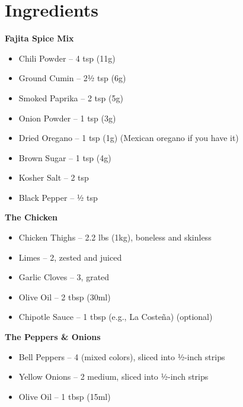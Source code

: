 




\section*{Ingredients}

\textbf{Fajita Spice Mix}
\begin{itemize}[itemsep=0.1em, label={\raisebox{-0.1ex}{\large\textbullet}}]
      \item[\measure] Chili Powder – 4 tsp (11g)
      \item[\measure] Ground Cumin – 2½ tsp (6g)
      \item[\measure] Smoked Paprika – 2 tsp (5g)
      \item[\measure] Onion Powder – 1 tsp (3g)
      \item[\measure] Dried Oregano – 1 tsp (1g) (Mexican oregano if you have it)
      \item[\measure] Brown Sugar – 1 tsp (4g)
      \item[\measure] Kosher Salt – 2 tsp
      \item[\measure] Black Pepper – ½ tsp
\end{itemize}

\textbf{The Chicken}
\begin{itemize}[itemsep=0.1em, label={\raisebox{-0.1ex}{\large\textbullet}}]
      \item Chicken Thighs – 2.2 lbs (1kg), boneless and skinless
      \item[\cut] Limes – 2, zested and juiced
      \item[\cut] Garlic Cloves – 3, grated
      \item[\measure] Olive Oil – 2 tbsp (30ml)
      \item[\measure] Chipotle Sauce – 1 tbsp (e.g., La Costeña) (optional)
\end{itemize}

\textbf{The Peppers \& Onions}
\begin{itemize}[itemsep=0.1em, label={\raisebox{-0.1ex}{\large\textbullet}}]
      \item[\cut] Bell Peppers – 4 (mixed colors), sliced into ½-inch strips
      \item[\cut] Yellow Onions – 2 medium, sliced into ½-inch strips
      \item[\measure] Olive Oil – 1 tbsp (15ml)
\end{itemize}

